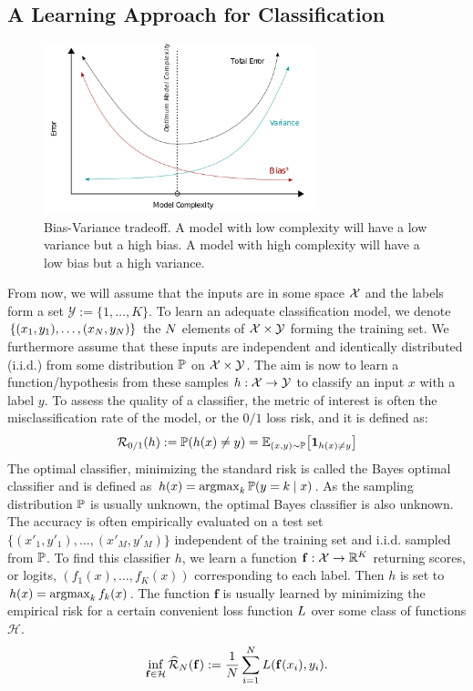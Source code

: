 \subsection{A Learning Approach for Classification}
\begin{figure}
    \centering
    \includegraphics[width=0.7\textwidth]{Images/tradeoff_bias_variance.png}
    \caption{Bias-Variance tradeoff. A model with low complexity will have a low variance but a high bias. A model with high complexity will have a low bias but a high variance.}
    \label{fig:tradeoff_bias_accuracy}
\end{figure}
From now, we will assume that the inputs are in some space $\mathcal{X}$ and the labels form a set $\mathcal{Y}:=\{1,\dots,K\}$. To learn an adequate classification model, we denote $\{(x_1,y_1),\dots,(x_N,y_N)\}$ the $N$ elements of $\mathcal{X}\times\mathcal{Y}$ forming the training set. We furthermore assume that these inputs are independent and identically distributed (i.i.d.) from some distribution $\mathbb{P}$ on $\mathcal{X}\times\mathcal{Y}$. The aim is now to learn a function/hypothesis from these samples $h:\mathcal{X}\to\mathcal{Y}$ to classify an input $x$ with a label $y$. To assess the quality of a classifier, the metric of interest is often the misclassification rate of the model, or the $0/1$ loss risk, and it is defined as:
\begin{align*}
\risk_{0/1}(h):=\PP(h(x)\neq y) = \EE_{(x,y)\sim\PP}\left[\mathbf{1}_{h(x)\neq y}\right]
\end{align*}
The optimal classifier, minimizing the standard risk is called the Bayes optimal classifier and is defined as $h(x) = \operatorname*{argmax}_k\mathbb{P}(y=k\mid x)$.
As the sampling distribution $\mathbb{P}$ is usually unknown, the optimal Bayes classifier is also unknown. The accuracy is often empirically evaluated on a test set $\{(x'_1,y'_1),\dots,(x'_M,y'_M)\}$ independent of the training set and i.i.d. sampled from $\mathbb{P}$.  To find this classifier $h$, we learn a function $\mathbf{f}:\mathcal{X}\to\mathbb{R}^K$ returning scores, or logits, $(f_1(x),\dots,f_K(x))$ corresponding to each label. Then $h$ is set to $h(x)=\operatorname*{argmax}_k f_k(x)$. The function $\mathbf{f}$ is usually learned by minimizing the empirical risk for a certain convenient loss function $L$ over some class of functions $\mathcal{H}$.
\begin{align*}
\inf_{\mathbf{f}\in\mathcal{H}}\widehat{\mathcal{R}}_{N}(\mathbf{f}):= \frac{1}{N}\sum_{i=1}^N L(\mathbf{f}(x_i),y_i).
\end{align*}

